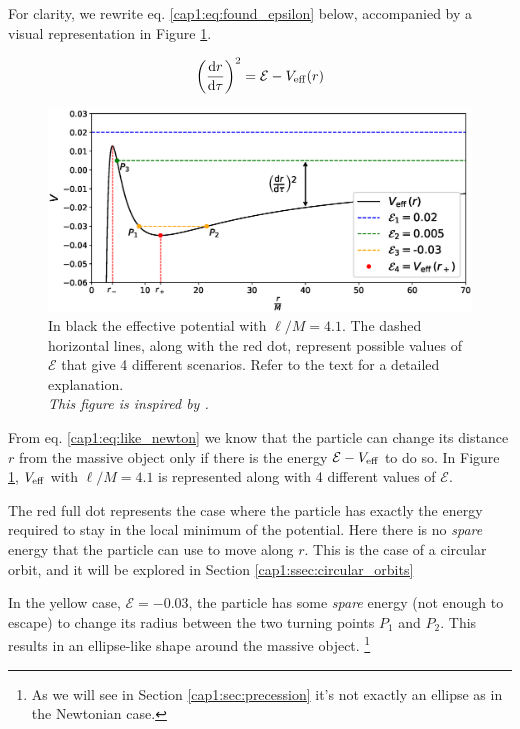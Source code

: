 For clarity, we rewrite eq. \ref{cap1:eq:found_epsilon} below, accompanied by a
visual representation in Figure \ref{cap1:fig:V_eff_orbits}.

\begin{equation}
    \left( \dv{r}{\tau} \right)^2 = \mathcal E - V_{\rm eff} (r)
    \label{cap1:eq:like_newton}
\end{equation}

\begin{figure}[h]
    \centering
    \includegraphics[width = \textwidth]{Figures/V_eff_orbits.eps}
    \caption{In black the effective potential with $\ell / M = 4.1$.
    The dashed horizontal lines, along with the red dot, represent possible
    values of $\mathcal E$ that give 4 different scenarios.
    Refer to the text for a detailed explanation. \\
    \textit{This figure is inspired by
    \cite[page 245, Figure 12.2]{shapiro2008black}.}}
    \label{cap1:fig:V_eff_orbits}
\end{figure}

From eq. \ref{cap1:eq:like_newton} we know that the particle can change its
distance $r$ from the massive object only if there is the energy
$\mathcal E - V_{\rm eff}$ to do so.
In Figure \ref{cap1:fig:V_eff_orbits}, $V_{\rm eff}$ with $\ell / M = 4.1$ is
represented along with 4 different values of $\mathcal E$.

The red full dot represents the case where the particle has exactly the energy
required to stay in the local minimum of the potential.
Here there is no \textit{spare} energy that the particle can use to move along
$r$.
This is the case of a circular orbit, and it will be explored in Section
\ref{cap1:ssec:circular_orbits}

In the yellow case, $\mathcal E = -0.03$, the particle has some \textit{spare}
energy (not enough to escape) to change its radius between the two turning
points $P_1$ and $P_2$.
This results in an ellipse-like shape around the massive object.
\footnote{As we will see in Section \ref{cap1:sec:precession} it's not
exactly an ellipse as in the Newtonian case.}

